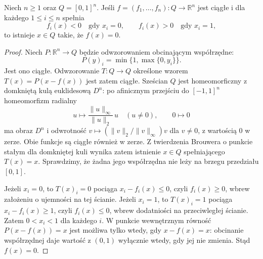 \begin{lemat}
\label{lem:topog23-poincare-miranda}
Niech \(n\ge1\) oraz \(Q=[0,1]^n\).
Jeśli \(f=(f_1,\ldots,f_n)\colon Q\to\mathbb R^n\)
jest ciągłe i dla każdego \(1\le i\le n\)
spełnia
\[
 f_i(x)<0\quad\text{gdy }x_i=0,
 \qquad
 f_i(x)>0\quad\text{gdy }x_i=1,
\]
to istnieje \(x\in Q\) takie, że \(f(x)=0\).
\end{lemat}
\begin{proof}
Niech \(P\colon\mathbb R^n\to Q\)
będzie odwzorowaniem obcinającym współrzędne:
\[
 P(y)_i=\min\{1,\max\{0,y_i\}\}.
\]
Jest ono ciągłe.
Odwzorowanie \(T\colon Q\to Q\)
określone wzorem \(T(x)=P(x-f(x))\)
jest zatem ciągłe.
Sześcian \(Q\) jest homeomorficzny
z domkniętą kulą euklidesową \(D^n\):
po afinicznym przejściu do \([-1,1]^n\)
homeomorfizm radialny
\[
 u\longmapsto
 \frac{\|u\|_\infty}{\|u\|_2}\,u
 \quad(u\neq0),\qquad 0\longmapsto0
\]
ma obraz \(D^n\) i odwrotność
\(v\mapsto(\|v\|_2/\|v\|_\infty)v\)
dla \(v\neq0\), z wartością \(0\) w zerze.
Obie funkcje są ciągłe również w zerze.
Z twierdzenia Brouwera o punkcie stałym
dla domkniętej kuli wynika zatem istnienie
\(x\in Q\) spełniającego \(T(x)=x\).
Sprawdzimy, że żadna jego współrzędna
nie leży na brzegu przedziału \([0,1]\).

Jeżeli \(x_i=0\), to \(T(x)_i=0\)
pociąga \(x_i-f_i(x)\le0\),
czyli \(f_i(x)\ge0\),
wbrew założeniu o ujemności na tej ścianie.
Jeżeli \(x_i=1\), to \(T(x)_i=1\)
pociąga \(x_i-f_i(x)\ge1\),
czyli \(f_i(x)\le0\),
wbrew dodatniości na przeciwległej ścianie.
Zatem \(0<x_i<1\) dla każdego \(i\).
W punkcie wewnętrznym równość
\(P(x-f(x))=x\) jest możliwa
tylko wtedy, gdy \(x-f(x)=x\):
obcinanie współrzędnej daje
wartość z \((0,1)\) wyłącznie wtedy,
gdy jej nie zmienia.
Stąd \(f(x)=0\).
\end{proof}

